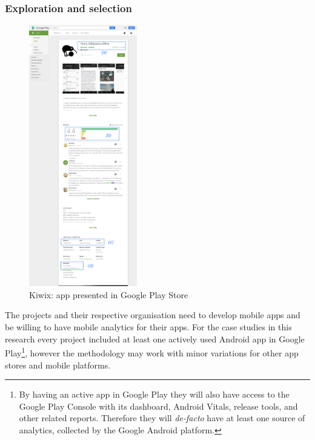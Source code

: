 \subsubsection{Exploration and selection}
\begin{figure}
  \begin{center}
    \includegraphics[width=0.42\textwidth]{images/google-play/annotated-resized40pct-2021-09-30-kiwix-app-on-google.png}
  \end{center}
  \caption{Kiwix: app presented in Google Play Store}
  \label{fig:gp-kiwix-app}
\end{figure}

The projects and their respective organisation need to develop mobile apps and be willing to have mobile analytics for their apps. For the case studies in this research every project included at least one actively used Android app in Google Play\footnote{By having an active app in Google Play they will also have access to the Google Play Console with its dashboard, Android Vitals, release tools, and other related reports. Therefore they will \emph{de-facto} have at least one source of analytics, collected by the Google Android platform.}, however the methodology may work with minor variations for other app stores and mobile platforms.


